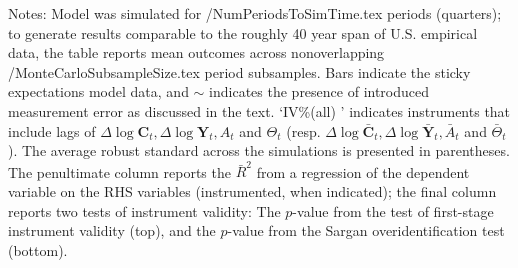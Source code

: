 Notes: Model was simulated for  \ParmDir/NumPeriodsToSimTime.tex
periods (quarters); to generate results comparable to the roughly
40 year span of U.S. empirical data, the table reports mean outcomes across 
nonoverlapping  \ParmDir/MonteCarloSubsampleSize.tex
period subsamples.  Bars indicate the sticky
expectations model data, and $\sim$ indicates the presence of
introduced measurement error as discussed in the text.
`IV\%(all)
' indicates instruments that include lags of $\Delta
\log \mathbf{C}_{t},\Delta
\log \mathbf{Y}_{t}, A_{t}$ and $\Theta_{t}$ (resp. $\Delta \log
\bar{\mathbf{C}}_{t}, \Delta \log
\bar{\mathbf{Y}}_{t}, \bar{A}_{t}$ and $\bar{\Theta}_{t}$).  %
The average robust standard across the simulations is presented in 
parentheses.  The penultimate column reports
the $\bar{R}^{2}$ from a regression of the dependent variable on the
RHS variables (instrumented, when indicated); the final column reports
two tests of instrument validity: The $p$-value from the
\cite{shea:iv} test of first-stage instrument validity (top), and the
$p$-value from the Sargan overidentification test (bottom).

